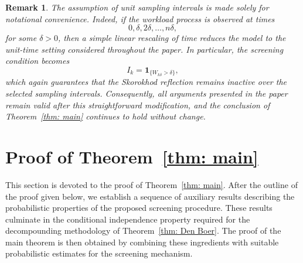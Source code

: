 \documentclass[12pt]{article}
\newcommand{\1}{\mathbf{1}}
\newtheorem{remark}{Remark}
\begin{document}
\begin{remark} \normalfont The assumption of unit sampling intervals is made solely for notational convenience. Indeed, if the workload process is observed at times \[ 0,\delta,2\delta,\ldots,n\delta, \] for some $\delta>0$, then a simple linear rescaling of time reduces the model to the unit-time setting considered throughout the paper. In particular, the screening condition becomes \[ I_k=\mathbf1_{\{W_{k\delta}>\delta\}}, \] which again guarantees that the Skorokhod reflection remains inactive over the selected sampling intervals. Consequently, all arguments presented in the paper remain valid after this straightforward modification, and the conclusion of Theorem~\ref{thm: main} continues to hold without change. \end{remark}

  
\section{Proof of Theorem~\ref{thm: main}}\label{sec: the proof}
This section is devoted to the proof of Theorem~\ref{thm: main}. After the outline of the proof given below, we establish a sequence of auxiliary results describing the probabilistic properties of the proposed screening procedure. These results culminate in the conditional independence property required for the decompounding methodology of Theorem~\ref{thm: Den Boer}. The proof of the main theorem is then obtained by combining these ingredients with suitable probabilistic estimates for the screening mechanism.
\end{document}

